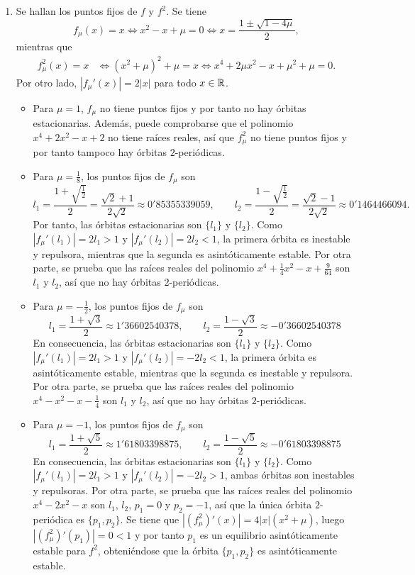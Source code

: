 \documentclass[11pt]{report}
\begin{document}
\begin{solution}
    \hfill
    \begin{enumerate}
        \item Se hallan los puntos fijos de $f$ y $f^2$. Se tiene
        \[f_\mu(x) = x \iff x^2-x+\mu = 0 \iff x = \frac{1 \pm \sqrt{1-4\mu}}{2},\]
        mientras que 
        \begin{align*}
            f_\mu^2(x) = x &\iff (x^2+\mu)^2+\mu = x \iff x^4+2\mu x^2-x+\mu^2+\mu = 0.
        \end{align*}
        Por otro lado, $|f_\mu'(x)| = 2|x|$ para todo $x \in \mathbb R$.
        \begin{itemize}
            \item Para $\mu = 1$, $f_\mu$ no tiene puntos fijos y por tanto no hay órbitas estacionarias. Además, puede comprobarse que el polinomio $x^4+2x^2-x+2$ no tiene raíces reales, así que $f_\mu^2$ no tiene puntos fijos y por tanto tampoco hay órbitas $2$-periódicas.
            \item Para $\mu = \frac{1}{8}$, los puntos fijos de $f_\mu$ son
            \[l_1 = \frac{1+\sqrt{\frac{1}{2}}}{2} = \frac{\sqrt{2}+1}{2\sqrt{2}} \approx 0'85355339059, \qquad l_2 = \frac{1-\sqrt{\frac{1}{2}}}{2} = \frac{\sqrt{2}-1}{2\sqrt{2}} \approx 0'1464466094.\]
            Por tanto, las órbitas estacionarias son $\{l_1\}$ y $\{l_2\}$. Como $|f_\mu'(l_1)| = 2l_1 > 1$ y $|f_\mu'(l_2)| = 2l_2 < 1$, la primera órbita es inestable y repulsora, mientras que la segunda es asintóticamente estable. Por otra parte, se prueba que las raíces reales del polinomio $x^4+\frac{1}{4}x^2-x+\frac{9}{64}$ son $l_1$ y $l_2$, así que no hay órbitas $2$-periódicas.
            \item Para $\mu = -\frac{1}{2}$, los puntos fijos de $f_\mu$ son
            \[l_1 = \frac{1+\sqrt{3}}{2} \approx 1'36602540378, \qquad l_2 = \frac{1-\sqrt{3}}{2} \approx -0'36602540378 \]
            En consecuencia, las órbitas estacionarias son $\{l_1\}$ y $\{l_2\}$. Como $|f_\mu'(l_1)| = 2l_1 > 1$ y $|f_\mu'(l_2)| = -2l_2 < 1$, la primera órbita es asintóticamente estable, mientras que la segunda es inestable y repulsora. Por otra parte, se prueba que las raíces reales del polinomio $x^4-x^2-x-\frac{1}{4}$ son $l_1$ y $l_2$, así que no hay órbitas $2$-periódicas.
            \item Para $\mu = -1$, los puntos fijos de $f_\mu$ son
            \[l_1 = \frac{1+\sqrt{5}}{2} \approx 1'61803398875, \qquad l_2 = \frac{1-\sqrt{5}}{2} \approx -0'61803398875 \]
            En consecuencia, las órbitas estacionarias son $\{l_1\}$ y $\{l_2\}$. Como $|f_\mu'(l_1)| = 2l_1 > 1$ y $|f_\mu'(l_2)| = -2l_2 > 1$, ambas órbitas son inestables y repulsoras. Por otra parte, se prueba que las raíces reales del polinomio $x^4-2x^2-x$ son $l_1$, $l_2$, $p_1 = 0$ y $p_2 = -1$, así que la única órbita $2$-periódica es $\{p_1,p_2\}$. Se tiene que $|(f_\mu^2)'(x)| = 4|x|(x^2+\mu)$, luego $|(f_\mu^2)'(p_1)| = 0 < 1$ y por tanto $p_1$ es un equilibrio asintóticamente estable para $f^2$, obteniéndose que la órbita $\{p_1,p_2\}$ es asintóticamente estable.

\end{itemize}
\end{enumerate}
\end{solution}
\end{document}
